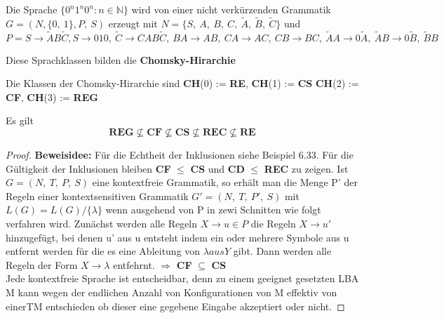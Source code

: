     Die Sprache \(\{0^n1^n0^n : n \in \mathbb{N}\}\) wird von einer nicht verkürzenden Grammatik \(G = (N, \{0,\ 1\}, P,\ S)\) erzeugt mit \(N =\{S,\ A,\ B,\ C,\ \tilde{A},\ \tilde{B},\ \tilde{C}\}\) und 
    \[
        P = S \to \tilde{A} B \tilde{C}, S \to 010,\ \tilde{C} \to CAB \tilde{C},\ BA \to AB,\ CA \to AC,\ CB\to BC,\ \tilde{A}A \to 0\tilde{A},\ \tilde{A}B \to 0\tilde{B},\ \tilde{B}B
    \]

    Diese Sprachklassen bilden die \textbf{Chomsky-Hirarchie}

    Die Klassen der Chomsky-Hirarchie sind \textbf{CH}(0) := \textbf{RE}, \textbf{CH}(1) := \textbf{CS} \textbf{CH}(2) := \textbf{CF}, \textbf{CH}(3) := \textbf{REG}
    
    Es gilt \[\textbf{REG} \not \subseteq \textbf{CF} \not \subseteq \textbf{CS} \not \subseteq\textbf{REC}\not \subseteq \textbf{RE}\]
    \begin{proof}
        \textbf{Beweisidee: } Für die Echtheit der Inklusionen siehe Beispiel 6.33. Für die Gültigkeit der Inklusionen bleiben \textbf{CF} \(\leq\) \textbf{CS} und \textbf{CD} \(\leq\) \textbf{REC} zu zeigen. Ist \(G = (N,\ T,\ P,\ S)\) eine kontextfreie Grammatik, so erhält man die Menge P' der Regeln einer kontextsensitiven Grammatik \(G' = (N,\ T,\ P',\ S)\) mit \(L(G) = L(G)/ \{\lambda\}\) wenn ausgehend von P in zewi Schnitten wie folgt verfahren wird. Zunächst werden alle Regeln \(X \to u \in P\) die Regeln \(X \to u'\) hinzugefügt, bei denen u' aus u entsteht indem ein oder mehrere Symbole aus u entfernt werden für die es eine Ableitung von \(\lambda aus Y\) gibt. Dann werden alle Regeln der Form \(X \to \lambda\) entfehrnt. \(\Rightarrow\) \textbf{CF} \(\subseteq\) \textbf{CS}\\ Jede kontextfreie Sprache ist entscheidbar, denn zu einem geeignet gesetzten LBA M kann wegen der endlichen Anzahl von Konfigurationen von M effektiv von einerTM entschieden ob dieser eine gegebene Eingabe akzeptiert oder nicht.
    \end{proof}

